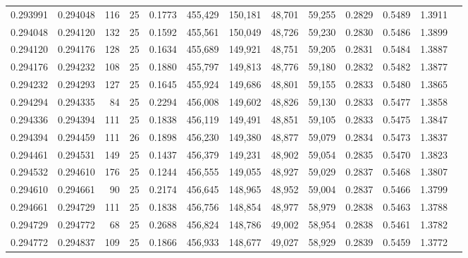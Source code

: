 \begin{tabular}{rrrrrrrrrrrrr}
0.293991 & 0.294048 &   116 &  25 &                                     0.1773 & 455,429 & 150,181 &  48,701 &  59,255 & 0.2829 & 0.5489 & 1.3911 \\
0.294048 & 0.294120 &   132 &  25 &                                     0.1592 & 455,561 & 150,049 &  48,726 &  59,230 & 0.2830 & 0.5486 & 1.3899 \\
0.294120 & 0.294176 &   128 &  25 &                                     0.1634 & 455,689 & 149,921 &  48,751 &  59,205 & 0.2831 & 0.5484 & 1.3887 \\
0.294176 & 0.294232 &   108 &  25 &                                     0.1880 & 455,797 & 149,813 &  48,776 &  59,180 & 0.2832 & 0.5482 & 1.3877 \\
0.294232 & 0.294293 &   127 &  25 &                                     0.1645 & 455,924 & 149,686 &  48,801 &  59,155 & 0.2833 & 0.5480 & 1.3865 \\
0.294294 & 0.294335 &    84 &  25 &                                     0.2294 & 456,008 & 149,602 &  48,826 &  59,130 & 0.2833 & 0.5477 & 1.3858 \\
0.294336 & 0.294394 &   111 &  25 &                                     0.1838 & 456,119 & 149,491 &  48,851 &  59,105 & 0.2833 & 0.5475 & 1.3847 \\
0.294394 & 0.294459 &   111 &  26 &                                     0.1898 & 456,230 & 149,380 &  48,877 &  59,079 & 0.2834 & 0.5473 & 1.3837 \\
0.294461 & 0.294531 &   149 &  25 &                                     0.1437 & 456,379 & 149,231 &  48,902 &  59,054 & 0.2835 & 0.5470 & 1.3823 \\
0.294532 & 0.294610 &   176 &  25 &                                     0.1244 & 456,555 & 149,055 &  48,927 &  59,029 & 0.2837 & 0.5468 & 1.3807 \\
0.294610 & 0.294661 &    90 &  25 &                                     0.2174 & 456,645 & 148,965 &  48,952 &  59,004 & 0.2837 & 0.5466 & 1.3799 \\
0.294661 & 0.294729 &   111 &  25 &                                     0.1838 & 456,756 & 148,854 &  48,977 &  58,979 & 0.2838 & 0.5463 & 1.3788 \\
0.294729 & 0.294772 &    68 &  25 &                                     0.2688 & 456,824 & 148,786 &  49,002 &  58,954 & 0.2838 & 0.5461 & 1.3782 \\
0.294772 & 0.294837 &   109 &  25 &                                     0.1866 & 456,933 & 148,677 &  49,027 &  58,929 & 0.2839 & 0.5459 & 1.3772 \\

\end{tabular}
